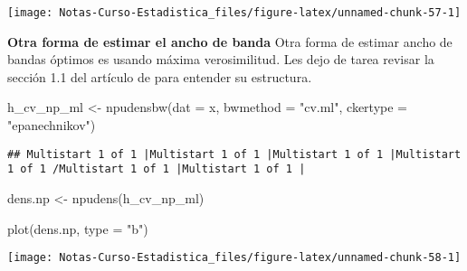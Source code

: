 \documentclass[
  12pt,
]{book}
\newenvironment{Shaded}{\begin{snugshade}}{\end{snugshade}}
\newcommand{\AttributeTok}[1]{\textcolor[rgb]{0.77,0.63,0.00}{#1}}
\newcommand{\FunctionTok}[1]{\textcolor[rgb]{0.00,0.00,0.00}{#1}}
\newcommand{\NormalTok}[1]{#1}
\newcommand{\OtherTok}[1]{\textcolor[rgb]{0.56,0.35,0.01}{#1}}
\newcommand{\StringTok}[1]{\textcolor[rgb]{0.31,0.60,0.02}{#1}}
\theoremstyle{definition}
\theoremstyle{definition}
\theoremstyle{definition}
\theoremstyle{definition}
\theoremstyle{remark}
\begin{document}
\begin{center}\texttt{[image: Notas-Curso-Estadistica\_files/figure-latex/unnamed-chunk-57-1]} \end{center}

\textbf{Otra forma de estimar el ancho de banda} Otra forma de estimar ancho
de bandas óptimos es usando máxima verosimilitud. Les dejo de tarea
revisar la sección 1.1 del artículo de \autocite{Hall1987} para entender su
estructura.

\begin{Shaded}
\begin{Highlighting}[]
\NormalTok{h\_cv\_np\_ml }\OtherTok{\textless{}{-}} \FunctionTok{npudensbw}\NormalTok{(}\AttributeTok{dat =}\NormalTok{ x, }\AttributeTok{bwmethod =} \StringTok{"cv.ml"}\NormalTok{,}
    \AttributeTok{ckertype =} \StringTok{"epanechnikov"}\NormalTok{)}
\end{Highlighting}
\end{Shaded}

\begin{verbatim}
## Multistart 1 of 1 |Multistart 1 of 1 |Multistart 1 of 1 |Multistart 1 of 1 /Multistart 1 of 1 |Multistart 1 of 1 |                   
\end{verbatim}

\begin{Shaded}
\begin{Highlighting}[]
\NormalTok{dens.np }\OtherTok{\textless{}{-}} \FunctionTok{npudens}\NormalTok{(h\_cv\_np\_ml)}

\FunctionTok{plot}\NormalTok{(dens.np, }\AttributeTok{type =} \StringTok{"b"}\NormalTok{)}
\end{Highlighting}
\end{Shaded}

\begin{center}\texttt{[image: Notas-Curso-Estadistica\_files/figure-latex/unnamed-chunk-58-1]} \end{center}
\end{document}
